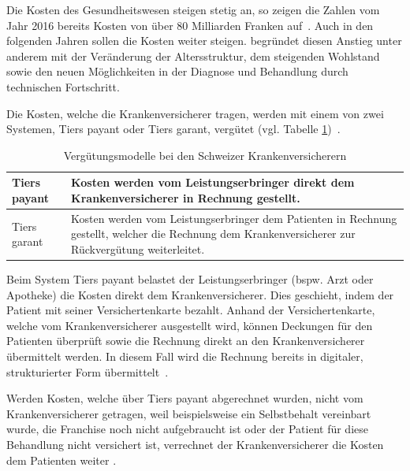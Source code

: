 Die Kosten des Gesundheitswesen steigen stetig an, so zeigen die Zahlen vom Jahr 2016 bereits Kosten von über 80 Milliarden Franken auf~\autocite{BfS2018}. Auch in den folgenden Jahren sollen die Kosten weiter steigen. \textcite{Kirchgassner2009} begründet diesen Anstieg unter anderem mit der Veränderung der Altersstruktur, dem steigenden Wohlstand sowie den neuen Möglichkeiten in der Diagnose und Behandlung durch technischen Fortschritt.

Die Kosten, welche die Krankenversicherer tragen, werden mit einem von zwei Systemen, Tiers payant oder Tiers garant, vergütet (vgl. Tabelle \ref{tiers})~\autocite{EDI2017}. 

\begin{table}[h!]
    \renewcommand{\arraystretch}{1.25}
    \setlength{\tabcolsep}{10pt}
    \caption{Vergütungsmodelle bei den Schweizer Krankenversicherern}
    \label{tiers}
    \begin{tabular}{| p{} | p{} |}
        \hline
         \cellcolor[HTML]{C0E5FD} Tiers payant & Kosten werden vom Leistungserbringer direkt dem Kranken\-versicherer in Rechnung gestellt. \\
        \hline
         \cellcolor[HTML]{C0E5FD}Tiers garant & Kosten werden vom Leistungserbringer dem Patienten in Rechnung gestellt, welcher die Rechnung dem Krankenversicherer zur Rückvergütung weiterleitet. \\
        \hline
    \end{tabular}
\end{table}

Beim System Tiers payant belastet der Leistungserbringer (bspw. Arzt oder Apotheke) die Kosten direkt dem Krankenversicherer. Dies geschieht, indem der Patient mit seiner Versichertenkarte bezahlt. Anhand der Versichertenkarte, welche vom Krankenversicherer ausgestellt wird, können Deckungen für den Patienten überprüft sowie die Rechnung direkt an den Krankenversicherer übermittelt werden. In diesem Fall wird die Rechnung bereits in digitaler, strukturierter Form übermittelt~\autocite{EDI2017}. 

Werden Kosten, welche über Tiers payant abgerechnet wurden, nicht vom Krankenversicherer getragen, weil beispielsweise ein Selbstbehalt vereinbart wurde, die Franchise noch nicht aufgebraucht ist oder der Patient für diese Behandlung nicht versichert ist, verrechnet der Krankenversicherer die Kosten dem Patienten weiter \autocite{EDI2017}.

